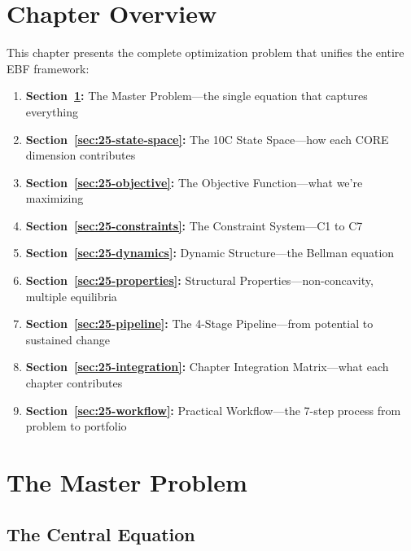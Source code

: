 \section*{Chapter Overview}

This chapter presents the complete optimization problem that unifies the entire EBF framework:

\begin{enumerate}
    \item \textbf{Section~\ref{sec:25-master-problem}:} The Master Problem---the single equation that captures everything
    \item \textbf{Section~\ref{sec:25-state-space}:} The 10C State Space---how each CORE dimension contributes
    \item \textbf{Section~\ref{sec:25-objective}:} The Objective Function---what we're maximizing
    \item \textbf{Section~\ref{sec:25-constraints}:} The Constraint System---C1 to C7
    \item \textbf{Section~\ref{sec:25-dynamics}:} Dynamic Structure---the Bellman equation
    \item \textbf{Section~\ref{sec:25-properties}:} Structural Properties---non-concavity, multiple equilibria
    \item \textbf{Section~\ref{sec:25-pipeline}:} The 4-Stage Pipeline---from potential to sustained change
    \item \textbf{Section~\ref{sec:25-integration}:} Chapter Integration Matrix---what each chapter contributes
    \item \textbf{Section~\ref{sec:25-workflow}:} Practical Workflow---the 7-step process from problem to portfolio
\end{enumerate}


\section{The Master Problem}
\label{sec:25-master-problem}

\subsection{The Central Equation}
\label{sec:25-central-equation}

